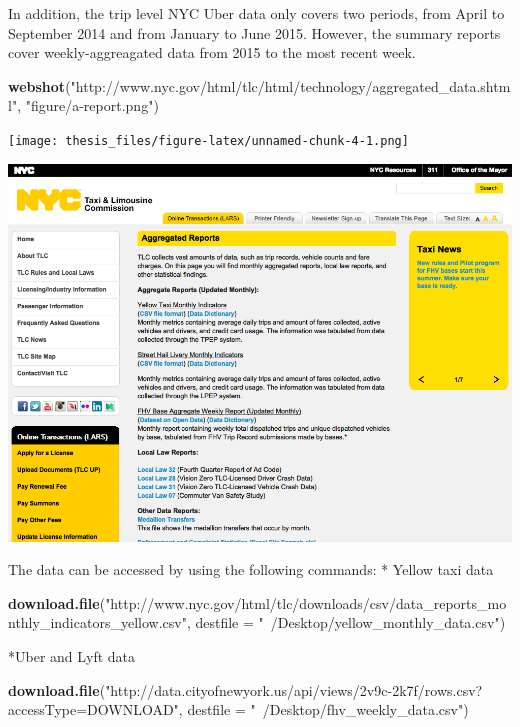 \documentclass[12pt,twoside]{reedthesis}
\newenvironment{Shaded}{\begin{snugshade}}{\end{snugshade}}
\newcommand{\KeywordTok}[1]{\textcolor[rgb]{0.13,0.29,0.53}{\textbf{#1}}}
\newcommand{\DataTypeTok}[1]{\textcolor[rgb]{0.13,0.29,0.53}{#1}}
\newcommand{\StringTok}[1]{\textcolor[rgb]{0.31,0.60,0.02}{#1}}
\newcommand{\NormalTok}[1]{#1}
\theoremstyle{definition}
\theoremstyle{definition}
\theoremstyle{definition}
\theoremstyle{remark}
\begin{document}
In addition, the trip level NYC Uber data only covers two periods, from
April to September 2014 and from January to June 2015. However, the
summary reports cover weekly-aggreagated data from 2015 to the most
recent week.
\begin{Shaded}
\begin{Highlighting}[]
\KeywordTok{webshot}\NormalTok{(}\StringTok{"http://www.nyc.gov/html/tlc/html/technology/aggregated_data.shtml"}\NormalTok{, }
    \StringTok{"figure/a-report.png"}\NormalTok{)}
\end{Highlighting}
\end{Shaded}
\texttt{[image: thesis\_files/figure-latex/unnamed-chunk-4-1.png]}
\begin{center}\includegraphics[width=14.01in]{figure/a-report} \end{center}

The data can be accessed by using the following commands: * Yellow taxi
data
\begin{Shaded}
\begin{Highlighting}[]
\KeywordTok{download.file}\NormalTok{(}\StringTok{"http://www.nyc.gov/html/tlc/downloads/csv/data_reports_monthly_indicators_yellow.csv"}\NormalTok{, }
    \DataTypeTok{destfile =} \StringTok{"~/Desktop/yellow_monthly_data.csv"}\NormalTok{)}
\end{Highlighting}
\end{Shaded}
*Uber and Lyft data
\begin{Shaded}
\begin{Highlighting}[]
\KeywordTok{download.file}\NormalTok{(}\StringTok{"http://data.cityofnewyork.us/api/views/2v9c-2k7f/rows.csv?accessType=DOWNLOAD"}\NormalTok{, }
    \DataTypeTok{destfile =} \StringTok{"~/Desktop/fhv_weekly_data.csv"}\NormalTok{)}
\end{Highlighting}
\end{Shaded}
\end{document}
